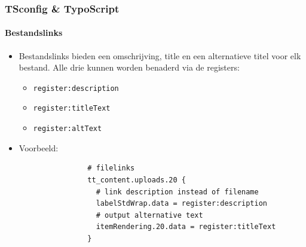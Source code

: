 \begin{frame}[fragile]
\begin{columns}[T]
	\end{columns}

\end{frame}


\begin{frame}[fragile]
	\frametitle{TSconfig \& TypoScript}
	\framesubtitle{Bestandslinks}

	\begin{itemize}
		\item Bestandslinks bieden een omschrijving, title en een alternatieve titel voor elk bestand. 
			Alle drie kunnen worden benaderd via de registers:

			\begin{itemize}
				\item \texttt{register:description}
				\item \texttt{register:titleText}
				\item \texttt{register:altText}
			\end{itemize}

		\item Voorbeeld:

			\begin{lstlisting}
				# filelinks
				tt_content.uploads.20 {
				  # link description instead of filename
				  labelStdWrap.data = register:description
				  # output alternative text
				  itemRendering.20.data = register:titleText
				}
			\end{lstlisting}

	\end{itemize}

\end{frame}


